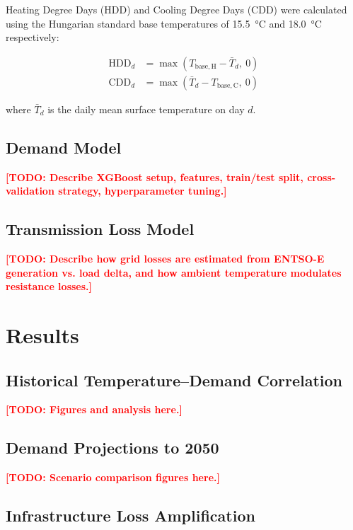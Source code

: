 \documentclass[11pt,a4paper]{article}
\newcommand{\HDD}{\mathrm{HDD}}
\newcommand{\CDD}{\mathrm{CDD}}
\newcommand{\todo}[1]{\textcolor{red}{\textbf{[TODO: #1]}}}
\begin{document}
Heating Degree Days (HDD) and Cooling Degree Days (CDD) were calculated 
using the Hungarian standard base temperatures of \SI{15.5}{\celsius} 
and \SI{18.0}{\celsius} respectively:

\begin{align}
  \HDD_d &= \max(T_\mathrm{base,H} - \bar{T}_d,\ 0) \label{eq:hdd} \\
  \CDD_d &= \max(\bar{T}_d - T_\mathrm{base,C},\ 0) \label{eq:cdd}
\end{align}

where $\bar{T}_d$ is the daily mean surface temperature on day $d$.

\subsection{Demand Model}
\label{sec:methods_model}

\todo{Describe XGBoost setup, features, train/test split, 
cross-validation strategy, hyperparameter tuning.}

\subsection{Transmission Loss Model}
\label{sec:methods_losses}

\todo{Describe how grid losses are estimated from ENTSO-E 
generation vs. load delta, and how ambient temperature 
modulates resistance losses.}

\section{Results}
\label{sec:results}

\subsection{Historical Temperature–Demand Correlation}
\label{sec:results_historical}

\todo{Figures and analysis here.}

\subsection{Demand Projections to 2050}
\label{sec:results_projections}

\todo{Scenario comparison figures here.}

\subsection{Infrastructure Loss Amplification}
\label{sec:results_losses}
\end{document}

